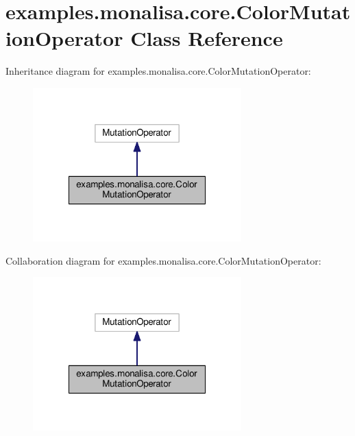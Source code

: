 \hypertarget{classexamples_1_1monalisa_1_1core_1_1_color_mutation_operator}{\section{examples.\-monalisa.\-core.\-Color\-Mutation\-Operator Class Reference}
\label{classexamples_1_1monalisa_1_1core_1_1_color_mutation_operator}
}


Inheritance diagram for examples.\-monalisa.\-core.\-Color\-Mutation\-Operator\-:
\nopagebreak
\begin{figure}[H]
\begin{center}
\leavevmode
\includegraphics[width=228pt]{classexamples_1_1monalisa_1_1core_1_1_color_mutation_operator__inherit__graph}
\end{center}
\end{figure}


Collaboration diagram for examples.\-monalisa.\-core.\-Color\-Mutation\-Operator\-:
\nopagebreak
\begin{figure}[H]
\begin{center}
\leavevmode
\includegraphics[width=228pt]{classexamples_1_1monalisa_1_1core_1_1_color_mutation_operator__coll__graph}
\end{center}
\end{figure}
